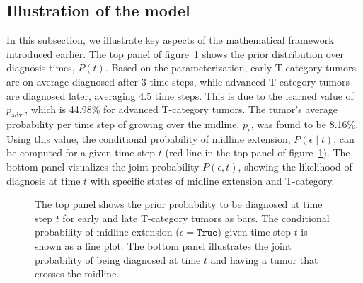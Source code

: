 \documentclass[
  sn-mathphys-num,
]{sn-jnl}
\begin{document}
\subsection{Illustration of the model}\label{illustration-of-the-model}

In this subsection, we illustrate key aspects of the mathematical
framework introduced earlier. The top panel of
figure~\ref{fig-model-midext-evo} shows the prior distribution over
diagnosis times, \(P(t)\). Based on the parameterization, early
T-category tumors are on average diagnosed after 3 time steps, while
advanced T-category tumors are diagnosed later, averaging 4.5 time
steps. This is due to the learned value of \(p_\text{adv.}\), which is
44.98\% for advanced T-category tumors. The tumor's average probability
per time step of growing over the midline, \(p_\epsilon\), was found to
be 8.16\%. Using this value, the conditional probability of midline
extension, \(P(\epsilon \mid t)\), can be computed for a given time step
\(t\) (red line in the top panel of figure~\ref{fig-model-midext-evo}).
The bottom panel visualizes the joint probability \(P(\epsilon, t)\),
showing the likelihood of diagnosis at time \(t\) with specific states
of midline extension and T-category.

\begin{figure}


\caption{\label{fig-model-midext-evo}The top panel shows the prior
probability to be diagnosed at time step \(t\) for early and late
T-category tumors as bars. The conditional probability of midline
extension (\(\epsilon=\texttt{True}\)) given time step \(t\) is shown as
a line plot. The bottom panel illustrates the joint probability of being
diagnosed at time \(t\) and having a tumor that crosses the midline.}

\end{figure}%
\end{document}

